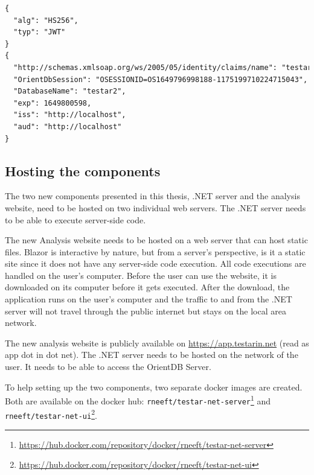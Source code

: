 \begin{lstlisting}[language=xml, caption=Decoded JWT header and Payload of the JWT given in listing \ref{code:jwt}, label=code:jwt-payload]
{
  "alg": "HS256",
  "typ": "JWT"
}
{
  "http://schemas.xmlsoap.org/ws/2005/05/identity/claims/name": "testar",
  "OrientDbSession": "OSESSIONID=OS1649796998188-1175199710224715043",
  "DatabaseName": "testar2",
  "exp": 1649800598,
  "iss": "http://localhost",
  "aud": "http://localhost"
}
\end{lstlisting}

\subsection{Hosting the components}
The two new components presented in this thesis, .NET server and the \testar analysis website, need to be hosted on two individual web servers. The .NET server needs to be able to execute server-side code. 

The new \testar Analysis website needs to be hosted on a web server that can host static files. Blazor is interactive by nature, but from a server's perspective, is it a static site since it does not have any server-side code execution. All code executions are handled on the user's computer. Before the user can use the website, it is downloaded on its computer before it gets executed. After the download, the application runs on the user's computer and the traffic to and from the .NET server will not travel through the public internet but stays on the local area network. 

The new \testar analysis website is publicly available on \url{https://app.testarin.net} (read as app dot \testar in dot net). The .NET server needs to be hosted on the network of the user. It needs to be able to access the OrientDB Server. 

To help setting up the two components, two separate docker images are created. Both are available on the docker hub: \verb|rneeft/testar-net-server|\footnote{\url{https://hub.docker.com/repository/docker/rneeft/testar-net-server}} and \verb|rneeft/testar-net-ui|\footnote{\url{https://hub.docker.com/repository/docker/rneeft/testar-net-ui}}.